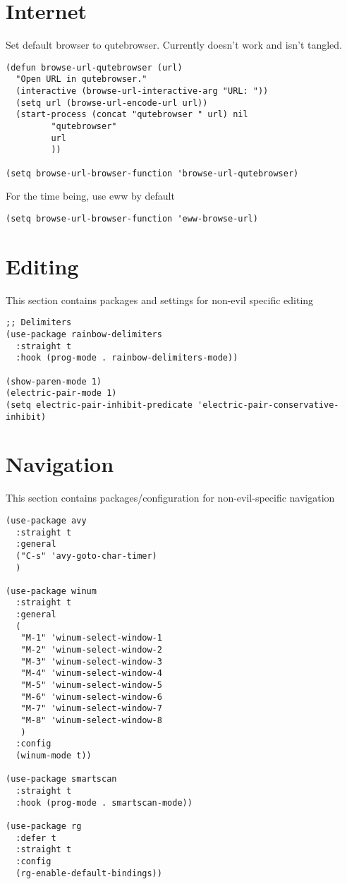 \documentclass[11pt]{article}
\begin{document}
\section{Internet}
\label{sec:org44b9d81}
Set default browser to qutebrowser.
Currently doesn't work and isn't tangled.
\begin{verbatim}
(defun browse-url-qutebrowser (url)
  "Open URL in qutebrowser."
  (interactive (browse-url-interactive-arg "URL: "))
  (setq url (browse-url-encode-url url))
  (start-process (concat "qutebrowser " url) nil
		 "qutebrowser"
		 url
		 ))

(setq browse-url-browser-function 'browse-url-qutebrowser)
\end{verbatim}

For the time being, use eww by default
\begin{verbatim}
(setq browse-url-browser-function 'eww-browse-url)
\end{verbatim}
\section{Editing}
\label{sec:org7dc8a8a}
This section contains packages and settings for
non-evil specific editing
\begin{verbatim}
;; Delimiters
(use-package rainbow-delimiters
  :straight t
  :hook (prog-mode . rainbow-delimiters-mode))

(show-paren-mode 1)
(electric-pair-mode 1)
(setq electric-pair-inhibit-predicate 'electric-pair-conservative-inhibit)
\end{verbatim}
\section{Navigation}
\label{sec:org6647b0f}
This section contains packages/configuration for
non-evil-specific navigation
\begin{verbatim}
(use-package avy
  :straight t
  :general
  ("C-s" 'avy-goto-char-timer)
  )

(use-package winum
  :straight t
  :general
  (
   "M-1" 'winum-select-window-1
   "M-2" 'winum-select-window-2
   "M-3" 'winum-select-window-3
   "M-4" 'winum-select-window-4
   "M-5" 'winum-select-window-5
   "M-6" 'winum-select-window-6
   "M-7" 'winum-select-window-7
   "M-8" 'winum-select-window-8
   )
  :config
  (winum-mode t))

(use-package smartscan
  :straight t
  :hook (prog-mode . smartscan-mode))

(use-package rg
  :defer t
  :straight t
  :config
  (rg-enable-default-bindings))
\end{verbatim}
\end{document}
